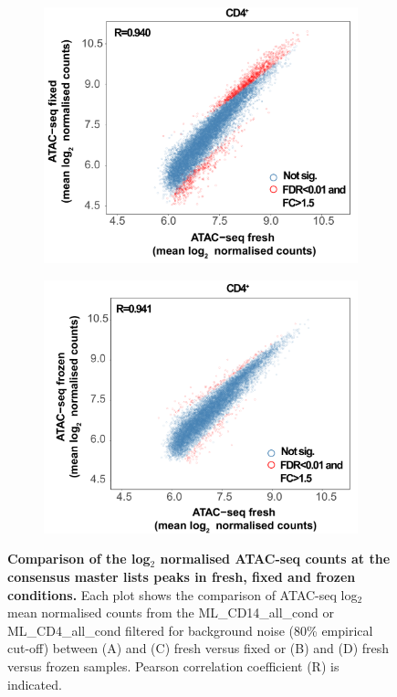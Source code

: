 \begin{figure}[H]
~
\begin{subfigure}[b]{0.45\textwidth} 
\centering
\includegraphics[width=\textwidth]{./Results1/pdfs/Core_ATAC_CD4_fresh_fixed_correlation_counts_small}%
\caption{}
\end{subfigure}
\begin{subfigure}[b]{0.45\textwidth} 
\centering
\includegraphics[width=\textwidth]{./Results1/pdfs/Core_ATAC_CD4_fresh_frozen_correlation_counts_small}
\caption{}
\end{subfigure}
\caption[Comparison of the log$_2$ normalised ATAC-seq counts at the consensus master lists peaks in fresh, fixed and frozen conditions.]{\textbf{Comparison of the log$_2$ normalised ATAC-seq counts at the consensus master lists peaks in fresh, fixed and frozen conditions.} Each plot shows the comparison of ATAC-seq log$_2$ mean normalised counts from the ML\_CD14\_all\_cond or ML\_CD4\_all\_cond filtered for background noise (80\% empirical cut-off) between (A) and (C) fresh versus fixed or (B) and (D) fresh versus frozen samples. Pearson correlation coefficient (R) is indicated.}
\label{figure:Core_ATAC_all-conditions_correlation}
\end{figure}
	
